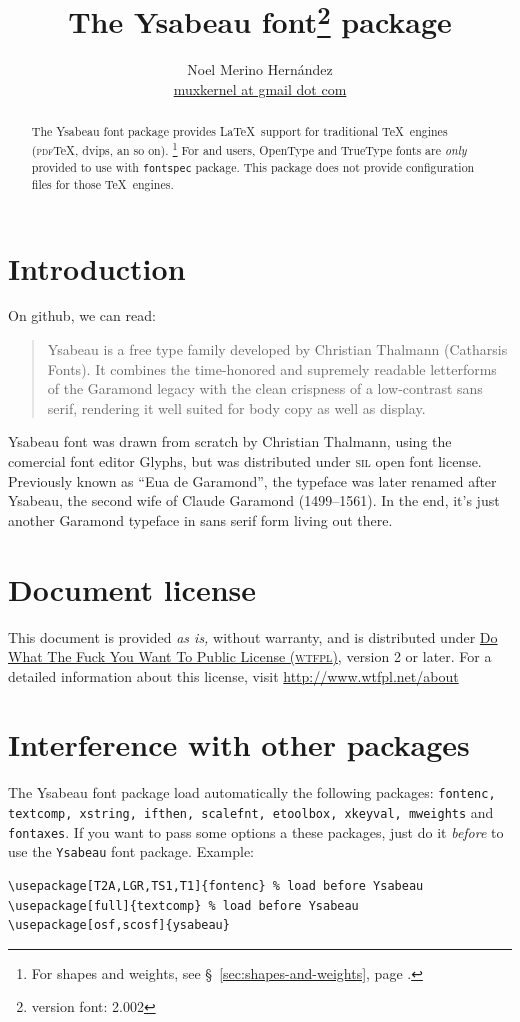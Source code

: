\documentclass[12pt,letterpaper,twoside,final]{article}
\title{The Ysabeau font\footnote{version font: 2.002} package}
\author{Noel Merino Hernández \\ {\small \href{muxkernel@gmail.com}{muxkernel at gmail dot com}}}
\let\oldfootnote\footnote
\renewcommand\footnote[1]{%
\oldfootnote{\hspace{.5mm}#1}}
\begin{document}
\maketitle
\raggedbottom
\begin{abstract}
\noindent The Ysabeau font package provides \LaTeX\ support for traditional \TeX\ engines (\textsc{pdf}\TeX, dvips, an so on).\footnote{For shapes and weights, see \S~\ref{sec:shapes-and-weights}, page \pageref{sec:shapes-and-weights}.} For  and  users, OpenType and TrueType fonts are \emph{only} provided to use with \texttt{fontspec} package. This package does not provide configuration files for those \TeX\ engines.
\end{abstract}
\section{Introduction}\label{sec:introduction}
\thispagestyle{empty}
\pagestyle{fancy}
\fancyhf{}
\fancyhead[LE,RO]{\thepage}
\renewcommand{\headrulewidth}{0.4pt}
On github, we can read:
\begin{quote}
Ysabeau is a free type family developed by Christian Thalmann (Catharsis Fonts). It combines the time-honored and supremely readable letterforms of the Garamond legacy with the clean crispness of a low-contrast sans serif, rendering it well suited for body copy as well as display.
\end{quote}
Ysabeau font was drawn from scratch by Christian Thalmann, using the comercial font editor Glyphs, but was distributed under \textsc{sil} open font license. Previously known as ``Eua de Garamond'', the typeface was later renamed after Ysabeau, the second wife of Claude Garamond (1499--1561). In the end, it's just another Garamond typeface in sans serif form living out there.
\section{Document license}\label{sec:document-license}
This document is provided \emph{as is,} without warranty, and is distributed under \href{http://www.wtfpl.net}{Do What The Fuck You Want To Public License (\textsc{wtfpl})}, version 2 or later. For a detailed information about this license, visit \url{http://www.wtfpl.net/about}
\section{Interference with other packages}
The Ysabeau font package load automatically the following packages: \texttt{fontenc, textcomp, xstring, ifthen, scalefnt, etoolbox, xkeyval, mweights} and \texttt{fontaxes}. If you want to pass some options a these packages, just do it \emph{before} to use the \texttt{Ysabeau} font package. Example:
\begin{verbatim}
\usepackage[T2A,LGR,TS1,T1]{fontenc} % load before Ysabeau
\usepackage[full]{textcomp} % load before Ysabeau
\usepackage[osf,scosf]{ysabeau}
\end{verbatim}
\end{document}
